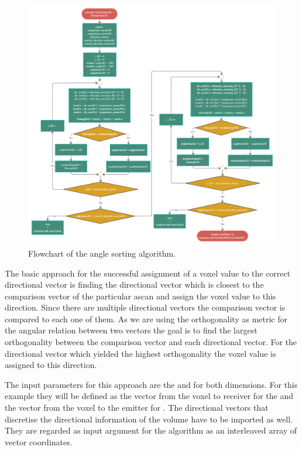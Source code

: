 \begin{figure}[H]
    \centering
    \includegraphics[width=1.12\textwidth]{Graphics/Angle_Sorting.png}
    \caption{Flowchart of the angle sorting algorithm.}
    \label{angle_sorting_flow}
\end{figure}

The basic approach for the successful assignment of a voxel value to the correct directional vector is finding the directional vector which is closest to the comparison vector of the particular \ac{ascan} and assign the voxel value to this direction. Since there are multiple directional vectors the comparison vector is compared to each one of them. As we are using the orthogonality as metric for the angular relation between two vectors the goal is to find the largest orthogonality between the comparison vector and each directional vector. For the directional vector which yielded the highest orthogonality the voxel value is assigned to this direction.

The input parameters for this approach are the  and  for both dimensions.
For this example they will be defined as the vector from the voxel to receiver for the  and the vector from the voxel to the emitter for  .
The directional vectors that discretise the directional information of the volume have to be imported as well. They are regarded as input argument for the algorithm as an interleaved array of vector coordinates. 

